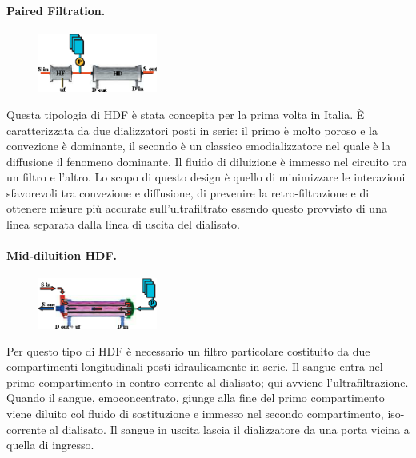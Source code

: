 \paragraph{Paired Filtration.}
\begin{figure}
	\centering
	\vspace{-10pt}
		\includegraphics[width=0.35\textwidth]{immagini/paired.eps}
		\vspace{-15pt}
\end{figure}
Questa tipologia di HDF è stata concepita per la prima volta in Italia. È caratterizzata da due dializzatori posti in serie: il primo è molto poroso e la convezione è dominante, il secondo è un classico emodializzatore nel quale è la diffusione il fenomeno dominante. Il fluido di diluizione è immesso nel circuito tra un filtro e l'altro. Lo scopo di questo design è quello di minimizzare le interazioni sfavorevoli tra convezione e diffusione, di prevenire la retro-filtrazione e di ottenere misure più accurate sull'ultrafiltrato essendo questo provvisto di una linea separata dalla linea di uscita del dialisato.

\paragraph{Mid-diluition HDF.}
\begin{figure}
	\centering
	\vspace{-10pt}
		\includegraphics[width=0.35\textwidth]{immagini/midHDF.eps}
		\vspace{-20pt}
\end{figure}
Per questo tipo di HDF è necessario un filtro particolare costituito da due compartimenti longitudinali posti idraulicamente in serie. Il sangue entra nel primo compartimento in contro-corrente al dialisato; qui avviene l'ultrafiltrazione. Quando il sangue, emoconcentrato, giunge alla fine del primo compartimento viene diluito col fluido di sostituzione e immesso nel secondo compartimento, iso-corrente al dialisato. Il sangue in uscita lascia il dializzatore da una porta vicina a quella di ingresso.

